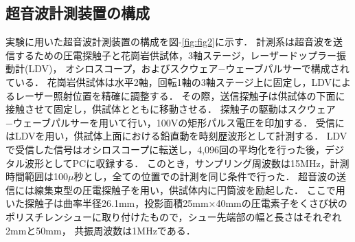 \subsection{超音波計測装置の構成}
実験に用いた超音波計測装置の構成を図-\ref{fig:fig2}に示す．
計測系は超音波を送信するための圧電探触子と花崗岩供試体，3軸ステージ，レーザードップラー振動計(LDV)，
オシロスコープ，およびスクウェア−ウェーブパルサーで構成されている．
花崗岩供試体は水平2軸，回転1軸の3軸ステージ上に固定し，LDVによるレーザー照射位置を精確に調整する．
その際，送信探触子は供試体の下面に接触させて固定し，供試体とともに移動させる．
探触子の駆動はスクウェア−ウェーブパルサーを用いて行い，100Vの矩形パルス電圧を印加する．
受信にはLDVを用い，供試体上面における鉛直動を時刻歴波形として計測する．
LDVで受信した信号はオシロスコープに転送し，4,096回の平均化を行った後，デジタル波形としてPCに収録する．
このとき，サンプリング周波数は15MHz，計測時間範囲は100$\mu$秒とし，全ての位置での計測を同じ条件で行った．
超音波の送信には線集束型の圧電探触子を用い，供試体内に円筒波を励起した．
ここで用いた探触子は曲率半径26.1mm，投影面積25mm×40mmの圧電素子をくさび状の
ポリスチレンシューに取り付けたもので，シュー先端部の幅と長さはそれぞれ2mmと50mm，
共振周波数は1MHzである\cite{Kimoto2020}．
